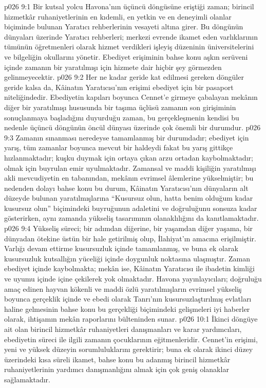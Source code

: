 \vs p026 9:1 Bir kutsal yolcu Havona’nın üçüncü döngüsüne eriştiği zaman; birincil hizmetkâr ruhaniyetlerinin en kıdemli, en yetkin ve en deneyimli olanlar biçiminde bulunan Yaratıcı rehberlerinin vesayeti altına girer. Bu döngünün dünyaları üzerinde Yaratıcı rehberleri; merkezi evrende ikamet eden varlıklarının tümünün öğretmenleri olarak hizmet verdikleri işleyiş düzeninin üniversitelerini ve bilgeliğin okullarını yönetir. Ebediyet erişiminin bahse konu aşkın serüveni içinde zamanın bir yaratılmışı için hizmete dair hiçbir şey görmezden gelinmeyecektir.
\vs p026 9:2 Her ne kadar geride kat edilmesi gereken döngüler geride kalsa da, Kâinatın Yaratıcısı’nın erişimi ebediyet için bir pasaport niteliğindedir. Ebediyetin kapıları boyunca Cennet’e girmeye çabalayan mekânın diğer bir yaratılmışı hususunda bir taşıma üçlüsü zamanın son girişiminin sonuçlanmaya başladığını duyurduğu zaman, bu gerçekleşmenin kendisi bu nedenle üçüncü döngünün öncül dünyası üzerinde çok önemli bir durumdur.
\vs p026 9:3 Zamanın sınanması neredeyse tamamlanmış bir durumdadır; ebediyet için yarış, tüm zamanlar boyunca mevcut bir haldeydi fakat bu yarış gittikçe hızlanmaktadır; kuşku duymak için ortaya çıkan arzu ortadan kaybolmaktadır;  olmak için buyrulan emir uyulmaktadır. Zamansal ve maddi kişiliğin yaratılmışı akli mevcudiyetin en tabanından, mekânın evrimsel âlemlerine yükselmiştir; bu nedenden dolayı bahse konu bu durum, Kâinatın Yaratıcısı’nın dünyaların alt düzeyde bulunan yaratılmışlarına “Kusursuz olun, hatta benim olduğum kadar kusursuz olun” biçimindeki buyruğunun adaletini ve doğruluğunu sonsuza kadar gösterirken, aynı zamanda yükseliş tasarımının olanaklılığını da kanıtlamaktadır.
\vs p026 9:4 Yükseliş süreci; bir adımdan diğerine, bir yaşamdan diğer yaşama, bir dünyadan ötekine üstün bir hale getirilmiş olup, İlahiyat’ın amacına erişilmiştir. Varlığı devam ettirme kusursuzluk içinde tamamlanmış, ve buna ek olarak kusursuzluk kutsallığın yüceliği içinde doygunluk noktasına ulaşmıştır. Zaman ebediyet içinde kaybolmakta; mekân ise, Kâinatın Yaratıcısı ile ibadetin kimliği ve uyumu içinde içine çekilerek yok olmaktadır. Havona yayınlayıcıları; doğruluğu amaç edinen hayvan kökenli ve maddi özlü yaratılmışların evrimsel yükseliş boyunca gerçeklik içinde ve ebedi olarak Tanrı’nın kusursuzlaştırılmış evlatları haline gelmesinin bahse konu bu gerçekliği biçimindeki gelişmeleri iyi haberler olarak, ihtişamın mekân raporlarını bülteninden sunar.
\vs p026 10:1 İkinci döngüye ait olan birincil hizmetkâr ruhaniyetleri danışmanları ve karar yardımcıları, ebediyetin süreci ile ilgili zamanın çocuklarının eğitmenleridir. Cennet’in erişimi, yeni ve yüksek düzeyin sorumluluklarını gerektirir; buna ek olarak ikinci düzey üzerindeki kısa süreli ikamet, bahse konu bu adanmış birincil hizmetkâr ruhaniyetlerinin yardımcı danışmanlığını almak için çok geniş olanaklar sağlamaktadır.
